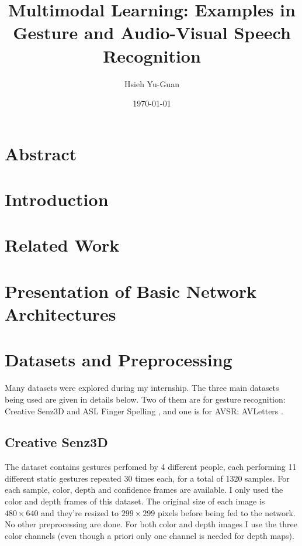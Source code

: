 

\title{Multimodal Learning: Examples in Gesture and Audio-Visual
Speech Recognition\vspace{-0.5em}}
\author{Hsieh Yu-Guan}
\date{\today}
\maketitle

\section*{Abstract}

\section{Introduction}

\section{Related Work}

\section{Presentation of Basic Network Architectures}

\section{Datasets and Preprocessing}

Many datasets were explored during my internship. The three main datasets
being used are given in details  below. Two of them are for gesture
recognition:
Creative Senz3D \cite{A. Memo 2015, A. Memo 2017} and ASL Finger Spelling
\cite{N. Pugeault 2011}, and one is for AVSR: AVLetters
\cite{I. Matthews 2002}.

\subsection{Creative Senz3D}

The dataset contains gestures perfomed by 4 different people, each
performing 11 different static gestures repeated 30 times each,
for a total of 1320 samples.
For each sample, color, depth and confidence frames are available.
I only used the color and depth frames of this dataset. The original
size of each image is $480 \times 640$ and they're resized to
$299 \times 299$ pixels before being fed to the network. No other
preprocessing are done. For both color and depth images I use the three
color channels (even though a priori only one channel is needed for
depth maps).

